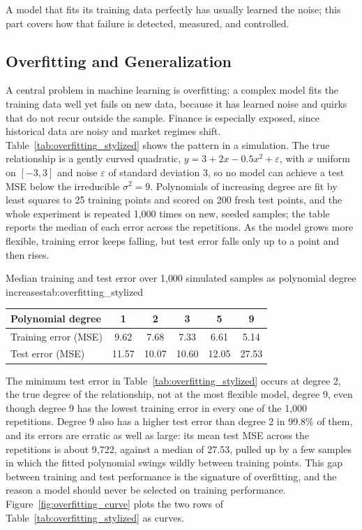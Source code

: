 \documentclass[../ai_in_finance]{subfiles}
\begin{document}
A model that fits its training data perfectly has usually learned the noise; this part covers how that failure is detected, measured, and controlled.

\subsection{Overfitting and Generalization}
\label{sec:overfitting-section}

A central problem in machine learning is overfitting: a complex model fits the training data well yet fails on new data, because it has learned noise and quirks that do not recur outside the sample. Finance is especially exposed, since historical data are noisy and market regimes shift. Table~\ref{tab:overfitting_stylized} shows the pattern in a simulation. The true relationship is a gently curved quadratic, $y = 3 + 2x - 0.5x^2 + \varepsilon$, with $x$ uniform on $[-3, 3]$ and noise $\varepsilon$ of standard deviation 3, so no model can achieve a test MSE below the irreducible $\sigma^2 = 9$. Polynomials of increasing degree are fit by least squares to 25 training points and scored on 200 fresh test points, and the whole experiment is repeated 1{,}000 times on new, seeded samples; the table reports the median of each error across the repetitions. As the model grows more flexible, training error keeps falling, but test error falls only up to a point and then rises.

\begin{booktable}[htbp]{Median training and test error over 1{,}000 simulated samples as polynomial degree increases}{tab:overfitting_stylized}
\begin{tabular}{lccccc}
\toprule
Polynomial degree & 1 & 2 & 3 & 5 & 9 \\
\midrule
Training error (MSE) & 9.62 & 7.68 & 7.33 & 6.61 & 5.14 \\
Test error (MSE)     & 11.57 & 10.07 & 10.60 & 12.05 & 27.53 \\
\bottomrule
\end{tabular}
\end{booktable}

The minimum test error in Table~\ref{tab:overfitting_stylized} occurs at degree 2, the true degree of the relationship, not at the most flexible model, degree 9, even though degree 9 has the lowest training error in every one of the 1{,}000 repetitions. Degree 9 also has a higher test error than degree 2 in 99.8\% of them, and its errors are erratic as well as large: its mean test MSE across the repetitions is about 9{,}722, against a median of 27.53, pulled up by a few samples in which the fitted polynomial swings wildly between training points. This gap between training and test performance is the signature of overfitting, and the reason a model should never be selected on training performance. Figure~\ref{fig:overfitting_curve} plots the two rows of Table~\ref{tab:overfitting_stylized} as curves.
\end{document}
